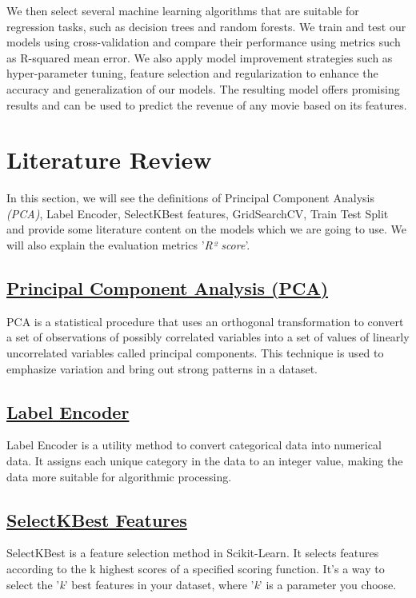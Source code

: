\documentclass[conference]{IEEEtran}
\begin{document}
        We then select several machine learning algorithms that are suitable for regression tasks, such as decision trees and random forests. We train and test our models using cross-validation and compare their performance using metrics such as R-squared mean error. We also apply model improvement strategies such as hyper-parameter tuning, feature selection and regularization to enhance the accuracy and generalization of our models. The resulting model offers promising results and can be used to predict the revenue of any movie based on its features.

\section{Literature Review}
    In this section, we will see the definitions of Principal Component Analysis \textit{(PCA)}, Label Encoder, SelectKBest features, GridSearchCV, Train Test Split and provide some literature content on the models which we are going to use. We will also explain the evaluation metrics '\textit{R² score}'.
    
    \subsection*{\href{https://en.wikipedia.org/wiki/Principal_component_analysis}{Principal Component Analysis (PCA)}}
    PCA is a statistical procedure that uses an orthogonal transformation to convert a set of observations of possibly correlated variables into a set of values of linearly uncorrelated variables called principal components. This technique is used to emphasize variation and bring out strong patterns in a dataset.
    
    \subsection*{\href{https://scikit-learn.org/stable/modules/generated/sklearn.preprocessing.LabelEncoder.html}{Label Encoder}}
    Label Encoder is a utility method to convert categorical data into numerical data. It assigns each unique category in the data to an integer value, making the data more suitable for algorithmic processing.
    
    \subsection*{\href{https://scikit-learn.org/stable/modules/generated/sklearn.feature_selection.SelectKBest.html}{SelectKBest Features}}
    SelectKBest is a feature selection method in Scikit-Learn. It selects features according to the k highest scores of a specified scoring function. It's a way to select the '\textit{k}' best features in your dataset, where '\textit{k}' is a parameter you choose.
    
\end{document}
